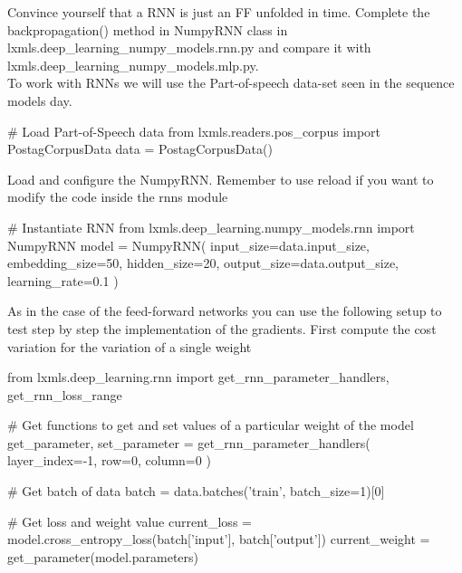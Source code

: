 \begin{exercise}
\label{exercise:rnnnumpy}
Convince yourself that a RNN is just an FF unfolded in time. Complete the 
backpropagation() method in NumpyRNN class in lxmls.deep\_learning\_numpy\_models.rnn.py
and compare it with\\ lxmls.deep\_learning\_numpy\_models.mlp.py.\\

\noindent To work with RNNs we will use the Part-of-speech data-set seen in the
sequence models day.
\begin{python}
# Load Part-of-Speech data 
from lxmls.readers.pos_corpus import PostagCorpusData
data = PostagCorpusData() 
\end{python}
\clearpage
\noindent Load and configure the NumpyRNN. Remember to use reload if you want to modify 
the code inside the rnns module
\begin{python}
# Instantiate RNN
from lxmls.deep_learning.numpy_models.rnn import NumpyRNN
model = NumpyRNN(
    input_size=data.input_size,
    embedding_size=50,
    hidden_size=20,
    output_size=data.output_size,
    learning_rate=0.1
)
\end{python}
As in the case of the feed-forward networks you can use the following setup to
test step by step the implementation of the gradients. First compute the cost
variation for the variation of a single weight
\begin{python}
from lxmls.deep_learning.rnn import get_rnn_parameter_handlers, get_rnn_loss_range

# Get functions to get and set values of a particular weight of the model
get_parameter, set_parameter = get_rnn_parameter_handlers(
    layer_index=-1,
    row=0, 
    column=0
)

# Get batch of data
batch = data.batches('train', batch_size=1)[0]

# Get loss and weight value
current_loss = model.cross_entropy_loss(batch['input'], batch['output'])
current_weight = get_parameter(model.parameters)


\end{python}
\end{exercise}
